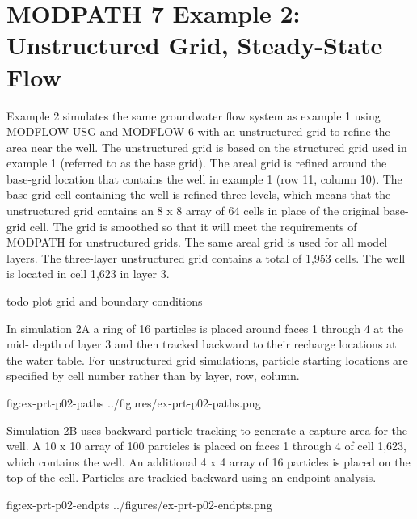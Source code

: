 \section{MODPATH 7 Example 2: Unstructured Grid, Steady-State Flow}

Example 2 simulates the same groundwater flow system as example 1 using MODFLOW-USG and MODFLOW-6 with an unstructured grid to refine the area near the well. The unstructured grid is based on the structured grid used in example 1 (referred to as the base grid). The areal grid is refined around the base-grid location that contains the well in example 1 (row 11, column 10). The base-grid cell containing the well is refined three levels, which means that the unstructured grid contains an 8 x 8 array of 64 cells in place of the original base-grid cell. The grid is smoothed so that it will meet the requirements of MODPATH for unstructured grids. The same areal grid is used for all model layers. The three-layer unstructured grid contains a total of 1,953 cells. The well is located in cell 1,623 in layer 3.

todo plot grid and boundary conditions

In simulation 2A a ring of 16 particles is placed around faces 1 through 4 at the mid- depth of layer 3 and then tracked backward to their recharge locations at the water table. For unstructured grid simulations, particle starting locations are specified by cell number rather than by layer, row, column.

\begin{StandardFigure}
	{fig:ex-prt-p02-paths}
	{../figures/ex-prt-p02-paths.png}
\end{StandardFigure}

Simulation 2B uses backward particle tracking to generate a capture area for the well. A 10 x 10 array of 100 particles is placed on faces 1 through 4 of cell 1,623, which contains the well. An additional 4 x 4 array of 16 particles is placed on the top of the cell. Particles are trackied backward using an endpoint analysis.

\begin{StandardFigure}
	{fig:ex-prt-p02-endpts}
	{../figures/ex-prt-p02-endpts.png}
\end{StandardFigure}